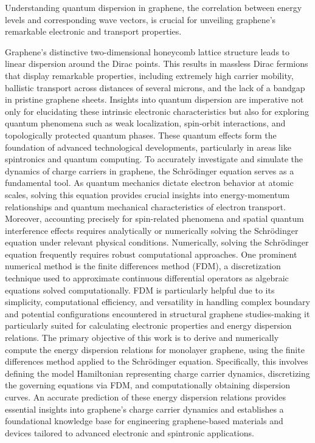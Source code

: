 Understanding quantum dispersion in graphene, the correlation between energy levels and corresponding wave vectors, is crucial for unveiling graphene's remarkable electronic and transport properties.

Graphene's distinctive two-dimensional honeycomb lattice structure leads to linear dispersion around the Dirac points.
This results in massless Dirac fermions that display remarkable properties, including extremely high carrier mobility, ballistic transport across distances of several microns, and the lack of a bandgap in pristine graphene sheets\cite{Serna2019}.
Insights into quantum dispersion are imperative not only for elucidating these intrinsic electronic characteristics but also for exploring quantum phenomena such as weak localization, spin-orbit interactions, and topologically protected quantum phases.
These quantum effects form the foundation of advanced technological developments, particularly in areas like spintronics and quantum computing\cite{WeizheMaterials2017, AvsarNatCommun2014, LiuNano2023}.
To accurately investigate and simulate the dynamics of charge carriers in graphene, the Schr\"odinger equation serves as a fundamental tool.
As quantum mechanics dictate electron behavior at atomic scales, solving this equation provides crucial insights into energy-momentum relationships and quantum mechanical characteristics of electron transport.
Moreover, accounting precisely for spin-related phenomena and spatial quantum interference effects requires analytically or numerically solving the Schr\"odinger equation under relevant physical conditions.
Numerically, solving the Schr\"odinger equation frequently requires robust computational approaches.
One prominent numerical method is the finite differences method (FDM), a discretization technique used to approximate continuous differential operators as algebraic equations solved computationally.
FDM is particularly helpful due to its simplicity, computational efficiency, and versatility in handling complex boundary and potential configurations encountered in structural graphene studies-making it particularly suited for calculating electronic properties and energy dispersion relations.
The primary objective of this work is to derive and numerically compute the energy dispersion relations for monolayer graphene, using the finite differences method applied to the Schr\"odinger equation.
Specifically, this involves defining the model Hamiltonian representing charge carrier dynamics, discretizing the governing equations via FDM, and computationally obtaining dispersion curves.
An accurate prediction of these energy dispersion relations provides essential insights into graphene's charge carrier dynamics and establishes a foundational knowledge base for engineering graphene-based materials and devices tailored to advanced electronic and spintronic applications.


